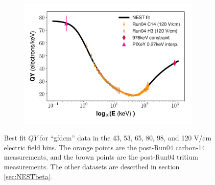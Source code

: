 \begin{figure}[h!]
\begin{subfigure}{0.5\textwidth}
  \caption{}
\end{subfigure}%
\begin{subfigure}{0.5\textwidth}
  \centering
  \includegraphics[width=\textwidth]{Figures/Yields_fit_old/NEST_fit_120Vcm_old_dcm.pdf}
  \caption{}
\end{subfigure}
\caption{Best fit $QY$ for ``gfdcm'' data in the 43, 53, 65, 80, 98, and 120 V/cm electric field bins. The orange points are the post-Run04 carbon-14 measurements, and the brown points are the post-Run04 tritium measurements. The other datasets are described in section \ref{sec:NESTbeta}.}
\label{fig:dcm_prelim_QY1}
\end{figure}

